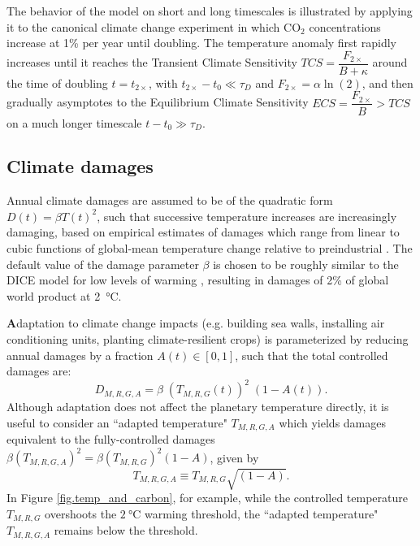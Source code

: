 \documentclass{article}
\begin{document}
The behavior of the model on short and long timescales is illustrated by applying it to the canonical climate change experiment in which CO$_{2}$ concentrations increase at 1\% per year until doubling. The temperature anomaly first rapidly increases until it reaches the Transient Climate Sensitivity $TCS = \dfrac{F_{2\times}}{B + \kappa}$ around the time of doubling $t=t_{2\times}$, with $t_{2\times} - t_{0} \ll \tau_{D}$ and $F_{2\times} = \alpha \ln(2)$, and then gradually asymptotes to the Equilibrium Climate Sensitivity $ECS = \dfrac{F_{2\times}}{B} > TCS$ on a much longer timescale $t-t_{0} \gg \tau_{D}$.

\subsection{Climate damages}

Annual climate damages are assumed to be of the quadratic form $D(t) = \beta T(t)^{2}$, such that successive temperature increases are increasingly damaging, based on empirical estimates of damages which range from linear to cubic functions of global-mean temperature change relative to preindustrial \citep{stern_economics_2007}. The default value of the damage parameter $\beta$ is chosen to be roughly similar to the DICE model for low levels of warming \citep{nordhaus2013dice}, resulting in damages of 2\% of global world product at \SI{2}{\celsius}.

\textbf{A}daptation to climate change impacts (e.g. building sea walls, installing air conditioning units, planting climate-resilient crops) is parameterized by reducing annual damages by a fraction $A(t) \in [0,1]$, such that the total controlled damages are:
\begin{equation}
    D_{M, R, G, A} = \beta \; (T_{M, R, G}(t))^{2} \; (1-A(t)).
\end{equation}
Although adaptation does not affect the planetary temperature directly, it is useful to consider an ``adapted temperature" $T_{M,R,G,A}$ which yields damages equivalent to the fully-controlled damages $\beta (T_{M,R,G,A})^{2} = \beta (T_{M,R,G})^{2} (1-A)$, given by
\begin{equation}
    T_{M,R,G,A} \equiv T_{M,R,G} \sqrt{(1-A)}.\label{eq.adapted_temperature}
\end{equation}
In Figure \ref{fig.temp_and_carbon}, for example, while the controlled temperature $T_{M,R,G}$ overshoots the $\SI{2}{\celsius}$ warming threshold, the ``adapted temperature" $T_{M,R,G,A}$ remains below the threshold.
\end{document}
